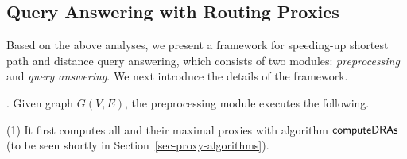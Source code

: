 \subsection{Query Answering with Routing Proxies}
\label{subsec-proxy-query}




 Based on the above analyses, we present a framework for speeding-up shortest  path and distance query answering, which consists of two modules: {\em preprocessing} and {\em query answering}. 
 We next introduce the details of the framework.

. Given graph $G(V, E)$, the preprocessing module executes the following.

\sstab (1) It first computes all \dras and their maximal proxies with algorithm ${\mathsf{computeDRAs}}$ (to be seen shortly in Section~\ref{sec-proxy-algorithms}).

